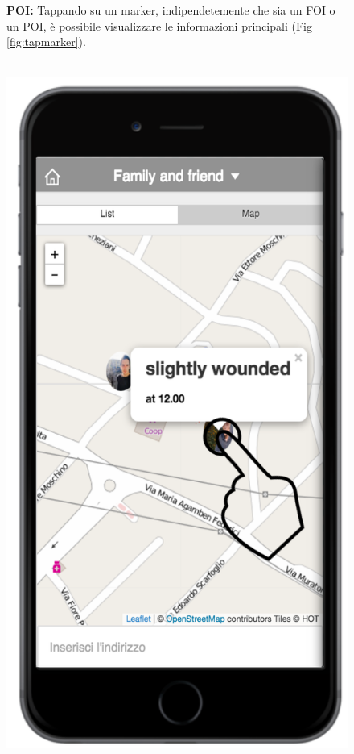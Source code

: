  \begin{figure}
\textbf{ POI:} Tappando su un marker, indipendetemente che sia un FOI o un POI, è possibile visualizzare le informazioni principali (Fig \ref{fig:tapmarker}). 
 \\ \\
 \begin{minipage}[b]{6cm}
   \centering
	\includegraphics[scale=0.6]{interfaccia/tapmarker.png}

\end{minipage}
\end{figure}
